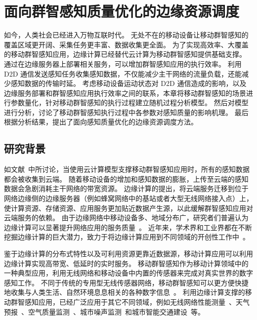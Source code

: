 

\chapter{面向群智感知质量优化的边缘资源调度}

如今，人类社会已经进入万物互联时代。
无处不在的移动设备让移动群智感知的覆盖区域更开阔、采集任务更丰富、数据收集更全面。
为了实现高效率、大覆盖的移动群智感知应用，边缘计算已经替代云计算为移动群智感知提供基础支撑。
通过在边缘服务器上部署相关服务，可以增加群智感知应用的执行效率。
利用 D2D 通信发送感知任务收集感知数据，不仅能减少主干网络的流量负载，还能减少感知数据的传输时延。
考虑移动设备运动状态对 D2D 通信造成的影响，以及边缘服务部署和群智感知应用执行效率之间的联系，本章将移动群智感知的场景进行参数量化，针对移动群智感知的执行过程建立随机过程分析模型。
然后对模型进行分析，讨论了移动群智感知执行过程中各参数对感知质量的影响机理。
最后根据分析结果，提出了面向感知质量优化的边缘资源调度方法。

\section{研究背景}

如文献~\cite{DBLP:journals/fgcs/AntonicMPZ16,DBLP:conf/ccnc/MessaoudRG16}中所讨论，当使用云计算模型支撑移动群智感知应用时，所有的感知数据都会被收集到云端。
随着移动设备的增加和感知数据的膨胀，上传至云端的感知数据会急剧消耗主干网络的带宽资源。
边缘计算的提出，将云端服务迁移到位于网络边缘侧的边缘服务器（例如蜂窝网络中的基站或者大型无线网络接入点）上，使计算资源、存储资源、应用服务更加贴近数据产生源，以此缓解群智感知应用对云端服务的依赖。
由于边缘网络中移动设备多、地域分布广，研究者们普遍认为边缘计算可以显著提升网络应用的服务质量~\cite{DBLP:conf/sigcomm/BonomiMZA12}。
近年来，学术界和工业界都在不断挖掘边缘计算的巨大潜力，致力于将边缘计算应用到不同领域的开创性工作中~\cite{DBLP:journals/access/MarjanovicAZ18,DBLP:journals/iotj/ChiangZ16}。


鉴于边缘计算的分布式特性以及可利用资源更靠近数据源，移动计算应用可以利用边缘计算实现高带宽、低延时的实时服务。
移动群智感知作为移动计算领域中的一种典型应用，利用无线网络和移动设备中内置的传感器来完成对真实世界的数字感知工作。
不同于传统的专用型无线传感器网络，移动群智感知可以更方便快捷地收集与人类生活、自然环境息息相关的各种数字信息~\cite{DBLP:journals/cm/GuoCZYC16}。
利用边缘计算支撑的移动群智感知应用，已经广泛应用于其它不同领域，例如无线网络性能测量~\cite{DBLP:journals/cm/RosenLLCMB14}、天气预报~\cite{DBLP:journals/tpds/ZhaoMTL15}、空气质量监测~\cite{DBLP:conf/huc/ZhangXWC14}、城市噪声监测~\cite{DBLP:conf/huc/ZhengLWZLC14}和城市智能交通建设~\cite{DBLP:conf/icdcs/ZhouJL15}等。

